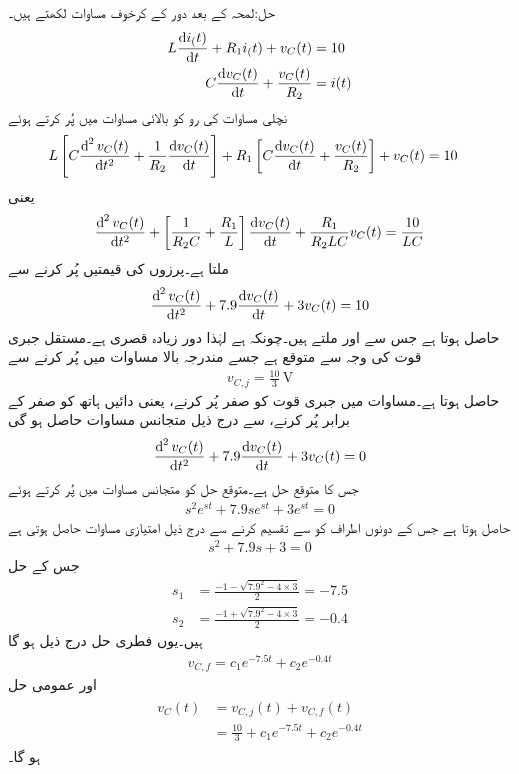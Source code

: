 حل:لمحہ  کے بعد دور کے کرخوف مساوات لکھتے ہیں۔
\begin{align*}
L\frac{\dif i_(t)}{\dif t}+R_1 i_(t)+v_C(t)&=10\\
C\frac{\dif v_C(t)}{\dif t}+\frac{v_C(t)}{R_2}&=i(t)
\end{align*}
نچلی مساوات کی رو کو بالائی مساوات  میں پُر کرتے  ہوئے
\begin{align*}
L\left[C\frac{\dif^{\,2} v_C(t)}{\dif t^2}+\frac{1}{R_2}\frac{\dif v_C(t)}{\dif t}\right]+R_1 \left[C\frac{\dif v_C(t)}{\dif t}+\frac{v_C(t)}{R_2} \right]+v_C(t)&=10
\end{align*}
یعنی
\begin{align*}
\frac{\dif^{\,2} v_C(t)}{\dif t^2}+\left[\frac{1}{R_2 C}+\frac{R_1}{L}\right]\frac{\dif v_C(t)}{\dif t}+\frac{R_1}{R_2 LC}v_C(t)=\frac{10}{LC}
\end{align*}
ملتا ہے۔پرزوں کی قیمتیں پُر کرنے سے
\begin{align}\label{مساوات_عارضی_زیادہ_قصری_مثال_الف}
\frac{\dif^{\,2} v_C(t)}{\dif t^2}+7.9 \frac{\dif v_C(t)}{\dif t}+3 v_C(t)=10
\end{align}
حاصل ہوتا ہے جس سے  اور  ملتے ہیں۔چونکہ  ہے لہٰذا دور زیادہ قصری ہے۔مستقل جبری قوت کی وجہ سے  متوقع ہے جسے مندرجہ بالا مساوات میں پُر کرنے سے
\begin{align*}
v_{C,j}=\frac{10}{3} \, \si{\volt}
\end{align*}
حاصل ہوتا ہے۔مساوات  میں جبری قوت کو صفر پُر کرنے، یعنی دائیں ہاتھ کو صفر کے برابر پُر کرنے، سے درج ذیل متجانس مساوات حاصل ہو گی
\begin{align*}
\frac{\dif^{\,2} v_C(t)}{\dif t^2}+7.9 \frac{\dif v_C(t)}{\dif t}+3 v_C(t)=0
\end{align*}
جس کا متوقع حل  ہے۔متوقع حل کو متجانس مساوات میں پُر کرتے ہوئے
\begin{align*}
s^2 e^{st}+7.9 s e^{st}+3 e^{st}=0
\end{align*}
حاصل ہوتا ہے جس کے دونوں اطراف کو  سے تقسیم کرنے سے درج ذیل امتیازی مساوات حاصل ہوتی ہے
\begin{align*}
s^2+7.9s+3=0
\end{align*}
جس کے حل
\begin{align*}
s_1&=\frac{-1-\sqrt{7.9^2-4\times 3}}{2}=-7.5\\
s_2&=\frac{-1+\sqrt{7.9^2-4\times 3}}{2}=-0.4
\end{align*}
ہیں۔یوں فطری حل درج ذیل ہو گا
\begin{align*}
v_{C,f}=c_1 e^{-7.5t}+c_2e^{-0.4t}
\end{align*}
اور عمومی حل
\begin{gather}
\begin{aligned}\label{مساوات_عارضی_زیادہ_قصری_مثال_ب}
v_C(t)&=v_{C,j}(t)+v_{C,f}(t)\\
&=\frac{10}{3}+c_1 e^{-7.5t}+c_2e^{-0.4t}
\end{aligned}
\end{gather}
ہو گا۔

